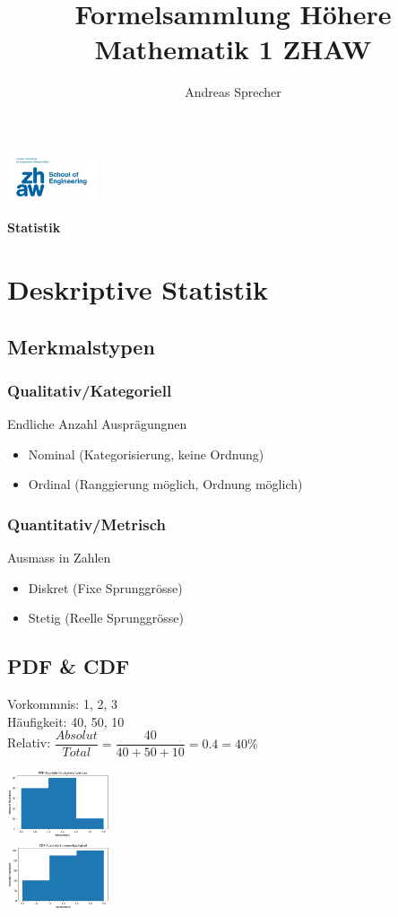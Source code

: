 \documentclass[8pt,a4paper]{scrartcl}
\title{Formelsammlung Höhere Mathematik 1 ZHAW}
\author{Andreas Sprecher}
\renewcommand{\emph}[1]{\textbf{#1}}                                                            %
\begin{document}
\begin{multicols*}{3}
\setlength{\columnseprule}{0.4pt}
    \parbox{3cm}{
        \includegraphics[height=1.5cm]{./img/Logo.jpeg}
    }
    \parbox{4cm}{
        \emph{\Large{Statistik}}
    }
    \vspace{-2mm} 

    \section{Deskriptive Statistik}
    		\subsection{Merkmalstypen}
    			\subsubsection{Qualitativ/Kategoriell}
    				Endliche Anzahl Ausprägungnen
    				\begin{itemize}\itemsep0pt				
					\item Nominal (Kategorisierung, keine Ordnung)
					\item Ordinal (Ranggierung möglich, Ordnung möglich)
				\end{itemize}
    			\subsubsection{Quantitativ/Metrisch}
    				Ausmass in Zahlen
    				\begin{itemize}\itemsep0pt				
					\item Diskret (Fixe Sprunggrösse)
					\item Stetig (Reelle Sprunggrösse)
				\end{itemize}
		\subsection{PDF \& CDF}
			Vorkommnis: 1, 2, 3 \\
			Häufigkeit: 40, 50, 10 \\
			Relativ: $\dfrac{Absolut}{Total} = \dfrac{40}{40+50+10} = 0.4 = 40 \%$\\
			\begin{multicols*}{2}
				\includegraphics[height=2cm]{img/pdf1.png} \\
				\includegraphics[height=2cm]{img/cdf1.png} \\
			\end{multicols*}
			

\end{multicols*}
\end{document}
